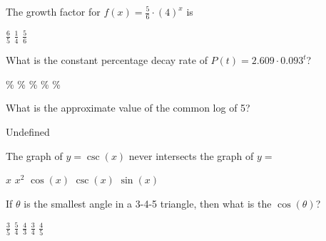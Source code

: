 \documentclass[addpoints]{exam}
\begin{document}
\begin{questions}
    \question[1] The growth factor for $f(x) = \frac{5}{6}\cdot (4)^x$ is
    
    \begin{oneparchoices}
        \choice $\frac{6}{5}$ 
        \choice $\frac{1}{4}$
        \choice $\frac{5}{6}$
        \end{oneparchoices}  \answerline

    \question[1] What is the constant percentage decay rate of $P(t) = 2.609 \cdot 0.093^t$?
    
    \begin{oneparchoices}
        \%
        \%
        \%
        \%
        \%
        \end{oneparchoices}  \answerline
    
    \question[1] What is the approximate value of the common log of 5?
    
    \begin{oneparchoices}
        \choice Undefined
        \end{oneparchoices}  \answerline
    
    
    \question[1] The graph of $y = \csc(x)$ never intersects the graph of $y =$
    
    \begin{oneparchoices}
        \choice $x$
        \choice $x^2$
        \choice $\cos(x)$
        \choice $\csc(x)$
        \choice $\sin(x)$
        \end{oneparchoices}  \answerline
    
    \question[1] If $\theta$ is the smallest angle in a 3-4-5 triangle, then what is the $\cos(\theta)$?
    
    \begin{oneparchoices}
        \choice $\frac{3}{5}$
        \choice $\frac{5}{4}$
        \choice $\frac{4}{3}$
        \choice $\frac{3}{4}$
        \choice $\frac{4}{5}$
        \end{oneparchoices}  \answerline
    

\end{questions}
\end{document}
